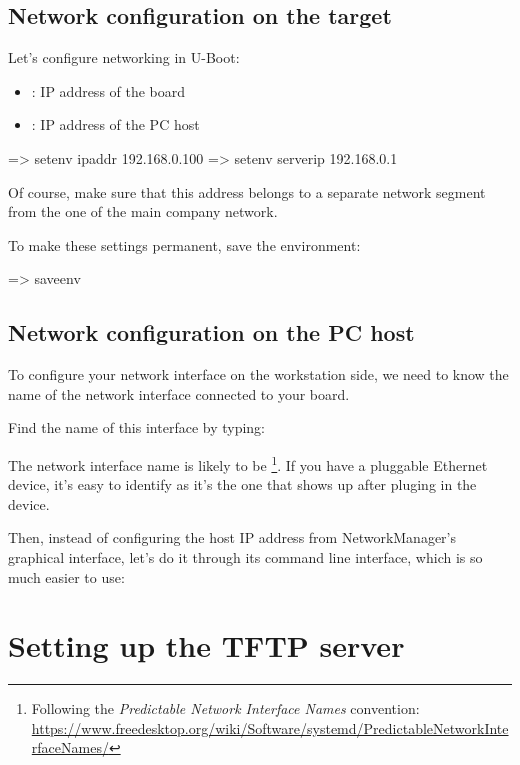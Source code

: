 \subsection{Network configuration on the target}

Let's configure networking in U-Boot:

\begin{itemize}
  \item {}: IP address of the board
  \item {}: IP address of the PC host
\end{itemize}

\begin{ubootinput}
=> setenv ipaddr 192.168.0.100
=> setenv serverip 192.168.0.1
\end{ubootinput}

Of course, make sure that this address belongs to a separate network
segment from the one of the main company network.

To make these settings permanent, save the environment:

\begin{ubootinput}
=> saveenv
\end{ubootinput}

\subsection{Network configuration on the PC host}

To configure your network interface on the workstation side, we need
to know the name of the network interface connected to your board.

Find the name of this interface by typing:

The network interface name is likely to be
\footnote{Following the {\em Predictable Network Interface
Names} convention:
\url{https://www.freedesktop.org/wiki/Software/systemd/PredictableNetworkInterfaceNames/}}.
If you have a pluggable Ethernet device, it's easy to identify as it's
the one that shows up after pluging in the device.

Then, instead of configuring the host IP address from NetworkManager's
graphical interface, let's do it through its command line interface,
which is so much easier to use:


\section{Setting up the TFTP server}

